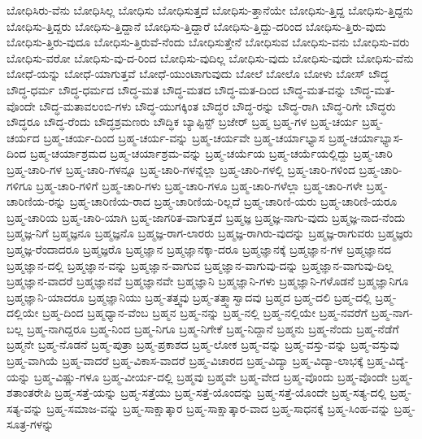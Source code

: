 {ಬೋಧಿಸಿರು-ವೆನು
ಬೋಧಿಸಿಲ್ಲ
ಬೋಧಿಸು
ಬೋಧಿಸುತ್ತದೆ
ಬೋಧಿಸು-ತ್ತಾನೆಯೇ
ಬೋಧಿಸು-ತ್ತಿದ್ದ
ಬೋಧಿಸು-ತ್ತಿದ್ದನು
ಬೋಧಿಸು-ತ್ತಿದ್ದರು
ಬೋಧಿಸು-ತ್ತಿದ್ದಾನೆ
ಬೋಧಿಸು-ತ್ತಿದ್ದಾರೆ
ಬೋಧಿಸು-ತ್ತಿದ್ದು-ದರಿಂದ
ಬೋಧಿಸು-ತ್ತಿರು-ವುದು
ಬೋಧಿಸು-ತ್ತಿರು-ವುದೂ
ಬೋಧಿಸು-ತ್ತಿರುವೆ-ನೆಂದು
ಬೋಧಿಸುತ್ತೇನೆ
ಬೋಧಿಸುವ
ಬೋಧಿಸು-ವನು
ಬೋಧಿಸು-ವರು
ಬೋಧಿಸು-ವರೋ
ಬೋಧಿಸು-ವು-ದ-ರಿಂದ
ಬೋಧಿಸು-ವುದಿಲ್ಲ
ಬೋಧಿಸು-ವುದು
ಬೋಧಿಸು-ವುದೇ
ಬೋಧಿಸು-ವೆನು
ಬೋಧೆ-ಯನ್ನು
ಬೋಧೆ-ಯಾಗುತ್ತವೆ
ಬೋಧೆ-ಯುಂಟಾಗುವುದು
ಬೋಲೆ
ಬೋಲೊ
ಬೋಳು
ಬೋಸ್
ಬೌದ್ಧ
ಬೌದ್ಧ-ಧರ್ಮ
ಬೌದ್ಧ-ಧರ್ಮದ
ಬೌದ್ಧ-ಮತ
ಬೌದ್ಧ-ಮತದ
ಬೌದ್ಧ-ಮತ-ದಿಂದ
ಬೌದ್ಧ-ಮತ-ವನ್ನು
ಬೌದ್ಧ-ಮತ-ವೊಂದೇ
ಬೌದ್ಧ-ಮತಾವಲಂಬಿ-ಗಳು
ಬೌದ್ಧ-ಯುಗಕ್ಕಿಂತ
ಬೌದ್ಧರ
ಬೌದ್ಧ-ರನ್ನು
ಬೌದ್ಧ-ರಾಗಿ
ಬೌದ್ಧ-ರಿಗೇ
ಬೌದ್ಧರು
ಬೌದ್ಧರೂ
ಬೌದ್ಧ-ರೆಂದು
ಬೌದ್ಧಶ್ರಮಣರು
ಬೌದ್ಧಿಕ
ಬ್ಯಾಪ್ಟಿಸ್ಟ್
ಬ್ರಜೇರ್
ಬ್ರಹ್ಮ
ಬ್ರಹ್ಮ-ಗಳ
ಬ್ರಹ್ಮ-ಚರ್ಯ
ಬ್ರಹ್ಮ-ಚರ್ಯದ
ಬ್ರಹ್ಮ-ಚರ್ಯ-ದಿಂದ
ಬ್ರಹ್ಮ-ಚರ್ಯ-ವನ್ನು
ಬ್ರಹ್ಮ-ಚರ್ಯವೇ
ಬ್ರಹ್ಮ-ಚರ್ಯಾಭ್ಯಾಸ
ಬ್ರಹ್ಮ-ಚರ್ಯಾಭ್ಯಾಸ-ದಿಂದ
ಬ್ರಹ್ಮ-ಚರ್ಯಾಶ್ರಮದ
ಬ್ರಹ್ಮ-ಚರ್ಯಾಶ್ರಮ-ವನ್ನು
ಬ್ರಹ್ಮ-ಚರ್ಯೆಯ
ಬ್ರಹ್ಮ-ಚರ್ಯೆಯಲ್ಲಿದ್ದು
ಬ್ರಹ್ಮ-ಚಾರಿ
ಬ್ರಹ್ಮ-ಚಾರಿ-ಗಳ
ಬ್ರಹ್ಮ-ಚಾರಿ-ಗಳನ್ನೂ
ಬ್ರಹ್ಮ-ಚಾರಿ-ಗಳನ್ನೆಲ್ಲಾ
ಬ್ರಹ್ಮ-ಚಾರಿ-ಗಳಲ್ಲಿ
ಬ್ರಹ್ಮ-ಚಾರಿ-ಗಳಿಂದ
ಬ್ರಹ್ಮ-ಚಾರಿ-ಗಳಿಗೂ
ಬ್ರಹ್ಮ-ಚಾರಿ-ಗಳಿಗೆ
ಬ್ರಹ್ಮ-ಚಾರಿ-ಗಳು
ಬ್ರಹ್ಮ-ಚಾರಿ-ಗಳೂ
ಬ್ರಹ್ಮ-ಚಾರಿ-ಗಳೆಲ್ಲಾ
ಬ್ರಹ್ಮ-ಚಾರಿ-ಗಳೇ
ಬ್ರಹ್ಮ-ಚಾರಿಣಿಯ-ರನ್ನು
ಬ್ರಹ್ಮ-ಚಾರಿಣಿಯ-ರಾದ
ಬ್ರಹ್ಮ-ಚಾರಿಣಿಯ-ರಿಲ್ಲದೆ
ಬ್ರಹ್ಮ-ಚಾರಿಣಿ-ಯರು
ಬ್ರಹ್ಮ-ಚಾರಿಣಿ-ಯರೂ
ಬ್ರಹ್ಮ-ಚಾರಿಯ
ಬ್ರಹ್ಮ-ಚಾರಿ-ಯಾಗಿ
ಬ್ರಹ್ಮ-ಜಾಗರಿತ-ವಾಗುತ್ತದೆ
ಬ್ರಹ್ಮಜ್ಞ
ಬ್ರಹ್ಮಜ್ಞ-ನಾಗು-ವುದು
ಬ್ರಹ್ಮಜ್ಞ-ನಾದ-ನೆಂದು
ಬ್ರಹ್ಮಜ್ಞ-ನಿಗೆ
ಬ್ರಹ್ಮಜ್ಞನೂ
ಬ್ರಹ್ಮಜ್ಞನೊ
ಬ್ರಹ್ಮಜ್ಞ-ರಾಗ-ಲಾರರು
ಬ್ರಹ್ಮಜ್ಞ-ರಾಗಿರು-ವುದನ್ನು
ಬ್ರಹ್ಮಜ್ಞ-ರಾಗುವರು
ಬ್ರಹ್ಮಜ್ಞರು
ಬ್ರಹ್ಮಜ್ಞ-ರೆಂದಾದರೂ
ಬ್ರಹ್ಮಜ್ಞರೊ
ಬ್ರಹ್ಮಜ್ಞಾನ
ಬ್ರಹ್ಮಜ್ಞಾನಕ್ಕಾ-ದರೂ
ಬ್ರಹ್ಮಜ್ಞಾನಕ್ಕೆ
ಬ್ರಹ್ಮಜ್ಞಾನ-ಗಳ
ಬ್ರಹ್ಮಜ್ಞಾನದ
ಬ್ರಹ್ಮಜ್ಞಾನ-ದಲ್ಲಿ
ಬ್ರಹ್ಮಜ್ಞಾನ-ವನ್ನು
ಬ್ರಹ್ಮಜ್ಞಾನ-ವಾಗುವ
ಬ್ರಹ್ಮಜ್ಞಾನ-ವಾಗುವು-ದನ್ನು
ಬ್ರಹ್ಮಜ್ಞಾನ-ವಾಗುವು-ದಿಲ್ಲ
ಬ್ರಹ್ಮಜ್ಞಾನ-ವಾದರೆ
ಬ್ರಹ್ಮಜ್ಞಾನವೆ
ಬ್ರಹ್ಮಜ್ಞಾನವೇ
ಬ್ರಹ್ಮಜ್ಞಾನಿ
ಬ್ರಹ್ಮಜ್ಞಾನಿ-ಗಳು
ಬ್ರಹ್ಮಜ್ಞಾನಿ-ಗಳೊಡನೆ
ಬ್ರಹ್ಮಜ್ಞಾನಿಗೂ
ಬ್ರಹ್ಮಜ್ಞಾನಿ-ಯಾದರೂ
ಬ್ರಹ್ಮಜ್ಞಾನಿಯು
ಬ್ರಹ್ಮ-ತತ್ತ್ವವು
ಬ್ರಹ್ಮ-ತತ್ತ್ವಾಸ್ವಾದವು
ಬ್ರಹ್ಮದ
ಬ್ರಹ್ಮ-ದಲಿ
ಬ್ರಹ್ಮ-ದಲ್ಲಿ
ಬ್ರಹ್ಮ-ದಲ್ಲಿಯೇ
ಬ್ರಹ್ಮ-ದಿಂದ
ಬ್ರಹ್ಮಧ್ಯಾನ-ವೆಂಬ
ಬ್ರಹ್ಮನ
ಬ್ರಹ್ಮ-ನನ್ನು
ಬ್ರಹ್ಮ-ನಲ್ಲಿ
ಬ್ರಹ್ಮ-ನಲ್ಲಿಯೇ
ಬ್ರಹ್ಮ-ನವರೆಗೆ
ಬ್ರಹ್ಮ-ನಾಗ-ಬಲ್ಲ
ಬ್ರಹ್ಮ-ನಾಗಿದ್ದರೂ
ಬ್ರಹ್ಮ-ನಿಂದ
ಬ್ರಹ್ಮ-ನಿಗೂ
ಬ್ರಹ್ಮ-ನಿಗೇಕೆ
ಬ್ರಹ್ಮ-ನಿದ್ದಾನೆ
ಬ್ರಹ್ಮನು
ಬ್ರಹ್ಮ-ನೆಂದು
ಬ್ರಹ್ಮ-ನೆಡೆಗೆ
ಬ್ರಹ್ಮನೇ
ಬ್ರಹ್ಮ-ನೊಡನೆ
ಬ್ರಹ್ಮ-ಪುತ್ರಾ
ಬ್ರಹ್ಮ-ಪ್ರಕಾಶದ
ಬ್ರಹ್ಮ-ಲೋಕ
ಬ್ರಹ್ಮ-ವನ್ನು
ಬ್ರಹ್ಮ-ವಸ್ತು-ವನ್ನು
ಬ್ರಹ್ಮ-ವಸ್ತುವು
ಬ್ರಹ್ಮ-ವಾಗಿಯೆ
ಬ್ರಹ್ಮ-ವಾದರೆ
ಬ್ರಹ್ಮ-ವಿಕಾಸ-ವಾದರೆ
ಬ್ರಹ್ಮ-ವಿಚಾರದ
ಬ್ರಹ್ಮ-ವಿದ್ಯಾ
ಬ್ರಹ್ಮ-ವಿದ್ಯಾ-ಲಾಭಕ್ಕೆ
ಬ್ರಹ್ಮ-ವಿದ್ಯೆ-ಯನ್ನು
ಬ್ರಹ್ಮ-ವಿಷ್ಣು-ಗಳೂ
ಬ್ರಹ್ಮ-ವೀರ್ಯ-ದಲ್ಲಿ
ಬ್ರಹ್ಮವು
ಬ್ರಹ್ಮವೇ
ಬ್ರಹ್ಮ-ವೇದ
ಬ್ರಹ್ಮ-ವೊಂದು
ಬ್ರಹ್ಮ-ವೊಂದೇ
ಬ್ರಹ್ಮ-ಶತಾಂತರೇಪಿ
ಬ್ರಹ್ಮ-ಸತ್ತೆ-ಯನ್ನು
ಬ್ರಹ್ಮ-ಸತ್ತೆಯು
ಬ್ರಹ್ಮ-ಸತ್ತೆ-ಯೊಂದನ್ನು
ಬ್ರಹ್ಮ-ಸತ್ತೆ-ಯೊಂದೇ
ಬ್ರಹ್ಮ-ಸತ್ಯ-ದಲ್ಲಿ
ಬ್ರಹ್ಮ-ಸತ್ಯ-ವನ್ನು
ಬ್ರಹ್ಮ-ಸಮಾಜ-ವನ್ನು
ಬ್ರಹ್ಮ-ಸಾಕ್ಷಾತ್ಕಾರ
ಬ್ರಹ್ಮ-ಸಾಕ್ಷಾತ್ಕಾರ-ವಾದ
ಬ್ರಹ್ಮ-ಸಾಧನಕ್ಕೆ
ಬ್ರಹ್ಮ-ಸಿಂಹ-ವನ್ನು
ಬ್ರಹ್ಮ-ಸೂತ್ರ-ಗಳನ್ನು
}
